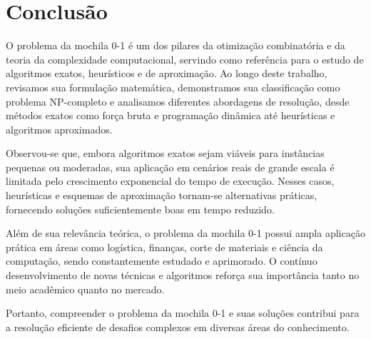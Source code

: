 \section{Conclusão}

O problema da mochila 0-1 é um dos pilares da otimização combinatória e da teoria da complexidade computacional,
servindo como referência para o estudo de algoritmos exatos, heurísticos e de aproximação.
Ao longo deste trabalho, revisamos sua formulação matemática, demonstramos sua classificação como problema NP-completo e analisamos diferentes abordagens de resolução,
desde métodos exatos como força bruta e programação dinâmica até heurísticas e algoritmos aproximados.

Observou-se que, embora algoritmos exatos sejam viáveis para instâncias pequenas ou moderadas,
sua aplicação em cenários reais de grande escala é limitada pelo crescimento exponencial do tempo de execução. 
Nesses casos, heurísticas e esquemas de aproximação tornam-se alternativas práticas, fornecendo soluções suficientemente boas em tempo reduzido.

Além de sua relevância teórica, o problema da mochila 0-1 possui ampla aplicação prática em áreas como logística, finanças,
corte de materiais e ciência da computação, sendo constantemente estudado e aprimorado.
O contínuo desenvolvimento de novas técnicas e algoritmos reforça sua importância tanto no meio acadêmico quanto no mercado.

Portanto, compreender o problema da mochila 0-1 e suas soluções contribui para a resolução eficiente de desafios complexos em diversas áreas do conhecimento.
